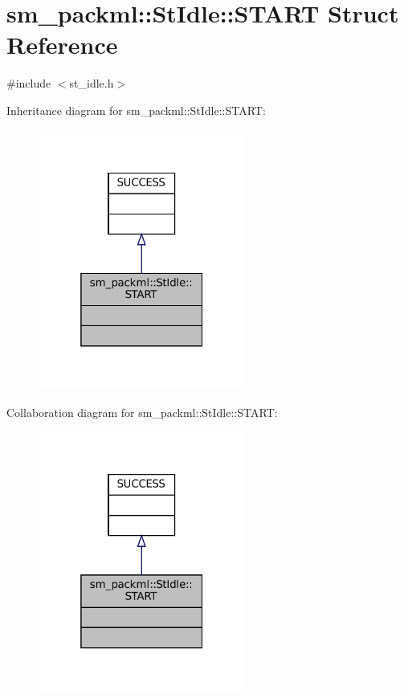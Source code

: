 \hypertarget{structsm__packml_1_1StIdle_1_1START}{}\section{sm\+\_\+packml\+:\+:St\+Idle\+:\+:S\+T\+A\+RT Struct Reference}
\label{structsm__packml_1_1StIdle_1_1START}


{\ttfamily \#include $<$st\+\_\+idle.\+h$>$}



Inheritance diagram for sm\+\_\+packml\+:\+:St\+Idle\+:\+:S\+T\+A\+RT\+:
\nopagebreak
\begin{figure}[H]
\begin{center}
\leavevmode
\includegraphics[width=193pt]{structsm__packml_1_1StIdle_1_1START__inherit__graph}
\end{center}
\end{figure}


Collaboration diagram for sm\+\_\+packml\+:\+:St\+Idle\+:\+:S\+T\+A\+RT\+:
\nopagebreak
\begin{figure}[H]
\begin{center}
\leavevmode
\includegraphics[width=193pt]{structsm__packml_1_1StIdle_1_1START__coll__graph}
\end{center}
\end{figure}


